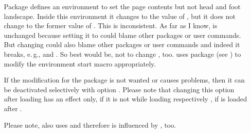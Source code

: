 Package  defines an
environment  to set the page
contents but not head and foot landscape. Inside this environment it changes
 to the value of
, but it does not change  to the former
value of .  This is inconsistent. As far as I know,
 is unchanged because setting it to 
could blame other packages or user commands. But changing 
could also blame other packages or user commands and indeed it breaks, e.\,g.,
 and
. So best would be, not to change
, too.  uses package  (see
\cite{package:xpatch}) to modify the environment start macro 
appropriately.

If the modification for the package is not wanted or causes problems,
then it can be deactivated selectively with option
.
Please note that changing this option after loading
 has an effect only, if it is not  while
loading  respectively , if
 is loaded after .

Please note,
 also uses
 and therefore is influenced by , too.%
%
\EndIndexGroup

\endinput

